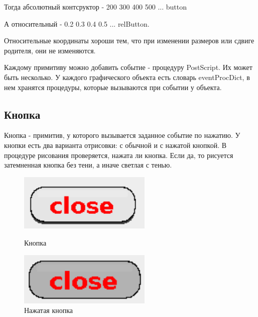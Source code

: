 \documentclass[14pt]{extarticle}
\begin{document}
		Тогда абсолютный контсруктор -
		200 300 400 500 ... button
		
А относительный - 
		0.2 0.3 0.4 0.5	... relButton.
		
		
Относительные координаты хороши тем, что при изменении размеров или сдвиге родителя, они не изменяются.

Каждому примитиву можно добавить событие - процедуру PostScript. Их может быть несколько. У каждого графического объекта есть словарь eventProcDict, в нем хранятся процедуры, которые вызываются при событии у объекта. 
	
	\subsection*{Кнопка}
	Кнопка - примитив, у которого вызывается заданное событие по нажатию. У кнопки есть два варианта отрисовки: с обычной и с нажатой кнопкой. В процедуре рисования проверяется, нажата ли кнопка. Если да, то рисуется затемненная кнопка без тени, а иначе светлая с тенью.
		\begin{figure}[h]
		\begin{center}
		\begin{minipage}[h]{0.4\linewidth}
		\includegraphics[width=180pt]{pictures/close1.png}
		\caption{ Кнопка} %
		\label{ris:b1} %
		\end{minipage}
		\hfill 
		\begin{minipage}[h]{0.4\linewidth}
		\includegraphics[width=180pt]{pictures/close2.png}
		\caption{Нажатая кнопка}
		\label{ris:b2}
		\end{minipage}
		\end{center}
		\end{figure}	
		
\end{document}

